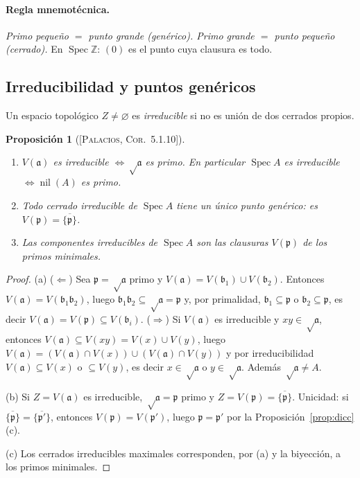 \documentclass[11pt,a4paper]{article}
\newcommand{\Spec}{\operatorname{Spec}}
\newcommand{\nil}{\operatorname{nil}}
\newcommand{\ZZ}{\mathbb{Z}}
\newcommand{\pp}{\mathfrak{p}}
\newcommand{\aaa}{\mathfrak{a}}
\newcommand{\bbb}{\mathfrak{b}}
\theoremstyle{plain}
\newtheorem{proposicion}[teorema]{Proposición}
\theoremstyle{definition}
\theoremstyle{remark}
\newcommand{\libro}[1]{\textsc{[Palacios, #1]}}
\begin{document}
\paragraph{Regla mnemotécnica.} \emph{Primo pequeño $=$ punto grande (genérico). Primo grande $=$ punto pequeño (cerrado).} En $\Spec\ZZ$: $(0)$ es el punto cuya clausura es todo.

\subsection{Irreducibilidad y puntos genéricos}

Un espacio topológico $Z\neq\varnothing$ es \emph{irreducible} si no es unión de dos cerrados propios.

\begin{proposicion}[{\libro{Cor.~5.1.10}}]\label{prop:irred}
\begin{enumerate}[label=(\alph*),itemsep=1pt]
\item $V(\aaa)$ es irreducible $\iff\sqrt\aaa$ es primo. En particular $\Spec A$ es irreducible $\iff\nil(A)$ es primo.
\item Todo cerrado irreducible de $\Spec A$ tiene un \emph{único} punto genérico: es $V(\pp)=\overline{\{\pp\}}$.
\item Las componentes irreducibles de $\Spec A$ son las clausuras $V(\pp)$ de los primos minimales.
\end{enumerate}
\end{proposicion}
\begin{proof}
(a) ($\Leftarrow$) Sea $\pp=\sqrt\aaa$ primo y $V(\aaa)=V(\bbb_1)\cup V(\bbb_2)$. Entonces $V(\aaa)=V(\bbb_1\bbb_2)$, luego $\bbb_1\bbb_2\subseteq\sqrt\aaa=\pp$ y, por primalidad, $\bbb_1\subseteq\pp$ o $\bbb_2\subseteq\pp$, es decir $V(\aaa)=V(\pp)\subseteq V(\bbb_i)$. ($\Rightarrow$) Si $V(\aaa)$ es irreducible y $xy\in\sqrt\aaa$, entonces $V(\aaa)\subseteq V(xy)=V(x)\cup V(y)$, luego $V(\aaa)=(V(\aaa)\cap V(x))\cup(V(\aaa)\cap V(y))$ y por irreducibilidad $V(\aaa)\subseteq V(x)$ o $\subseteq V(y)$, es decir $x\in\sqrt\aaa$ o $y\in\sqrt\aaa$. Además $\sqrt\aaa\ne A$.

(b) Si $Z=V(\aaa)$ es irreducible, $\sqrt\aaa=\pp$ primo y $Z=V(\pp)=\overline{\{\pp\}}$. Unicidad: si $\overline{\{\pp\}}=\overline{\{\pp'\}}$, entonces $V(\pp)=V(\pp')$, luego $\pp=\pp'$ por la Proposición~\ref{prop:dicc}(c).

(c) Los cerrados irreducibles maximales corresponden, por (a) y la biyección, a los primos minimales.
\end{proof}
\end{document}
